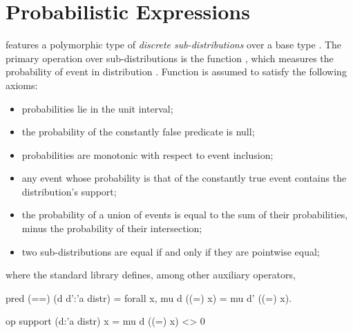 \section{Probabilistic Expressions\label{sec:distributions}}

\EasyCrypt features a polymorphic type
 of
\emph{discrete sub-distributions} over a base type . The primary
operation over sub-distributions is the function
%
,
which measures the probability of event  in distribution .
Function  is assumed to satisfy the following axioms:
\begin{itemize}\itemsep-.5em
\item probabilities lie in the unit interval;\\
\item the probability of the constantly false predicate  is null;\\
\item probabilities are monotonic with respect to event inclusion;\\
\item any event whose probability is that of the constantly true event
   contains the distribution's support;\\
\item the probability of a union of events is equal to the sum of
  their probabilities, minus the probability of their intersection;\\
\item two sub-distributions are equal if and only if they are pointwise equal;
\end{itemize}

where the standard library  defines, among other auxiliary operators,
\begin{easycrypt}[frame=none]{}
pred (==) (d d':'a distr) = forall x, mu d ((=) x) = mu d' ((=) x).

op support (d:'a distr) x = mu d ((=) x) <> 0%
\end{easycrypt}


